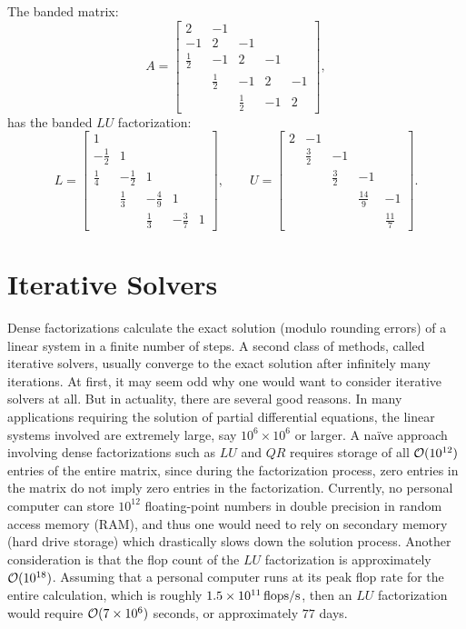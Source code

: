 \begin{example}
The banded matrix:
\[
A = \begin{bmatrix} 2 & -1\\ -1 & 2 & -1\\ \frac{1}{2} & -1 & 2 & -1\\ & \frac{1}{2} & -1 & 2 & -1\\ & & \frac{1}{2} & -1 & 2\end{bmatrix},
\]
has the banded $LU$ factorization:
\[
L = \begin{bmatrix} 1\\ -\frac{1}{2} & 1\\ \frac{1}{4} & -\frac{1}{2} & 1\\ & \frac{1}{3} & -\frac{4}{9} & 1\\ & & \frac{1}{3} & -\frac{3}{7} & 1\end{bmatrix},\qquad
U = \begin{bmatrix} 2 & -1\\ & \frac{3}{2} & -1\\ & & \frac{3}{2} & -1\\ & & & \frac{14}{9} & -1\\ & & & & \frac{11}{7}\end{bmatrix}.
\]
\end{example}

\section{Iterative Solvers}

Dense factorizations calculate the exact solution (modulo rounding errors) of a linear system in a finite number of steps. A second class of methods, called iterative solvers, usually converge to the exact solution after infinitely many iterations. At first, it may seem odd why one would want to consider iterative solvers at all. But in actuality, there are several good reasons. In many applications requiring the solution of partial differential equations, the linear systems involved are extremely large, say $10^6\times10^6$ or larger. A na\"ive approach involving dense factorizations such as $LU$ and $QR$ requires storage of all $\mathcal{O}(10^{12})$ entries of the entire matrix, since during the factorization process, zero entries in the matrix do not imply zero entries in the factorization. Currently, no personal computer can store $10^{12}$ floating-point numbers in double precision in random access memory (RAM), and thus one would need to rely on secondary memory (hard drive storage) which drastically slows down the solution process. Another consideration is that the flop count of the $LU$ factorization is approximately $\mathcal{O}(10^{18})$. Assuming that a personal computer runs at its peak flop rate for the entire calculation, which is roughly $1.5\times10^{11}{\rm\,flops/s}$, then an $LU$ factorization would require $\mathcal{O}(7\times 10^6)$ seconds, or approximately $77$ days.

